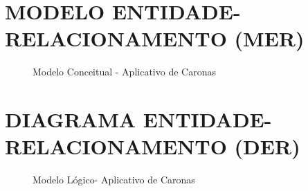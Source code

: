 \begin{anexosenv}

\chapter{MODELO ENTIDADE-RELACIONAMENTO (MER)}
\begin{figure}[h!]
	\centering
	\caption{Modelo Conceitual - Aplicativo de Caronas}
	\label{fig:modelo_conceitual_banco}
\end{figure}


\chapter{DIAGRAMA ENTIDADE-RELACIONAMENTO (DER)}

\begin{figure}[h!]
	\centering
	\caption{Modelo Lógico- Aplicativo de Caronas}
	\label{fig:modelo_logico_banco}
\end{figure}



\end{anexosenv}
